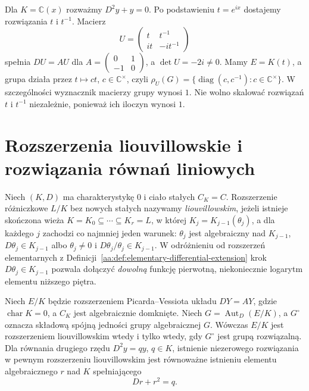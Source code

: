 \begin{przyklad}
\label{aa:prz:pv-harmonic}
Dla $K=\mathbb C(x)$ rozważmy
$D^2y+y=0$. Po podstawieniu
$t=e^{ix}$ dostajemy rozwiązania
$t$ i $t^{-1}$. Macierz
\[
 U=\begin{pmatrix}t&t^{-1}\\
                   it&-it^{-1}\end{pmatrix}
\]
spełnia $DU=AU$ dla
$A=\left(\begin{smallmatrix}0&1\\-1&0\end{smallmatrix}\right)$,
a $\det U=-2i\ne0$.
Mamy $E=K(t)$,
a grupa działa przez
$t\mapsto ct$, $c\in\mathbb C^\times$,
czyli
$\rho_U(G)=\{
\operatorname{diag}(c,c^{-1}):
c\in\mathbb C^\times\}$.
W szczególności wyznacznik
macierzy grupy wynosi $1$.
Nie wolno skalować rozwiązań
$t$ i $t^{-1}$ niezależnie,
ponieważ ich iloczyn wynosi $1$.
\end{przyklad}

\section{Rozszerzenia liouvillowskie i rozwiązania równań liniowych}

\begin{definicja}
\label{aa:def:pv-liouvillian}
Niech $(K,D)$ ma charakterystykę $0$
i ciało stałych $C_K=C$.
Rozszerzenie różniczkowe $L/K$
bez nowych stałych nazywamy
\emph{liouvillowskim}, jeżeli istnieje
skończona wieża
$K=K_0\subseteq\cdots\subseteq K_r=L$,
w której $K_j=K_{j-1}(\theta_j)$,
a dla każdego $j$ zachodzi
co najmniej jeden warunek:
$\theta_j$ jest algebraiczny
nad $K_{j-1}$,
$D\theta_j\in K_{j-1}$ albo
$\theta_j\ne0$ i
$D\theta_j/\theta_j\in K_{j-1}$.
W odróżnieniu od rozszerzeń
elementarnych z
Definicji~\ref{aa:def:elementary-differential-extension}
krok $D\theta_j\in K_{j-1}$
pozwala dołączyć \emph{dowolną}
funkcję pierwotną, niekoniecznie
logarytm elementu niższego piętra.
\end{definicja}

\begin{twierdzenie}
\label{aa:tw:pv-liouvillian-criterion}
Niech $E/K$ będzie rozszerzeniem
Picarda--Vessiota układu $DY=AY$,
gdzie $\operatorname{char}K=0$,
a $C_K$ jest algebraicznie domknięte.
Niech $G=\operatorname{Aut}_D(E/K)$,
a $G^\circ$ oznacza składową spójną
jedności grupy algebraicznej $G$.
Wówczas $E/K$ jest rozszerzeniem
liouvillowskim wtedy i tylko wtedy,
gdy $G^\circ$ jest grupą rozwiązalną.
Dla równania drugiego rzędu
$D^2y=qy$, $q\in K$, istnienie
niezerowego rozwiązania w
pewnym rozszerzeniu liouvillowskim
jest równoważne istnieniu
elementu algebraicznego $r$
nad $K$ spełniającego
\begin{equation}\label{aa:eq:pv-riccati}
 Dr+r^2=q.
\end{equation}
\end{twierdzenie}

